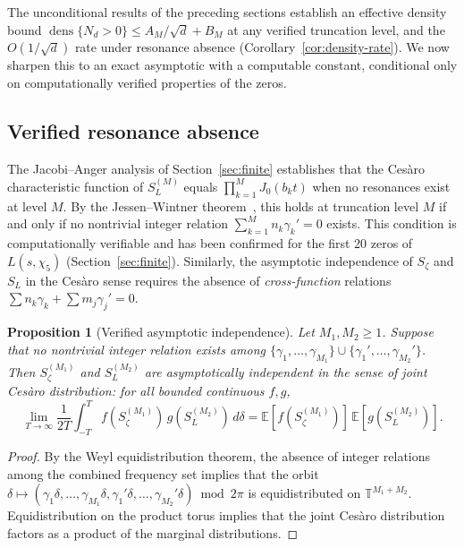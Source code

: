 \documentclass[12pt,reqno]{amsart}
\theoremstyle{plain}
\newtheorem{proposition}[theorem]{Proposition}
\theoremstyle{definition}
\theoremstyle{remark}
\DeclareMathOperator{\dens}{dens}
\newcommand{\T}{\mathbb{T}}
\newcommand{\E}{\mathbb{E}}
\begin{document}
The unconditional results of the preceding sections establish an effective density bound $\dens\{N_d > 0\} \leq A_M/\sqrt{d} + B_M$ at any verified truncation level, and the $O(1/\sqrt{d})$ rate under resonance absence (Corollary~\ref{cor:density-rate}).  We now sharpen this to an exact asymptotic with a computable constant, conditional only on computationally verified properties of the zeros.


\subsection{Verified resonance absence}

The Jacobi--Anger analysis of Section~\ref{sec:finite} establishes that the Ces\`aro characteristic function of $S_L^{(M)}$ equals $\prod_{k=1}^M J_0(b_k t)$ when no resonances exist at level $M$.  By the Jessen--Wintner theorem~\cite{JessenWintner}, this holds at truncation level $M$ if and only if no nontrivial integer relation $\sum_{k=1}^M n_k\gamma_k' = 0$ exists.  This condition is computationally verifiable and has been confirmed for the first 20 zeros of $L(s,\chi_5)$ (Section~\ref{sec:finite}).  Similarly, the asymptotic independence of $S_\zeta$ and $S_L$ in the Ces\`aro sense requires the absence of \emph{cross-function} relations $\sum n_k\gamma_k + \sum m_j\gamma_j' = 0$.

\begin{proposition}[Verified asymptotic independence]\label{prop:verified_indep}
Let $M_1, M_2 \geq 1$.  Suppose that no nontrivial integer relation exists among $\{\gamma_1,\ldots,\gamma_{M_1}\} \cup \{\gamma_1',\ldots,\gamma_{M_2}'\}$.  Then $S_\zeta^{(M_1)}$ and $S_L^{(M_2)}$ are asymptotically independent in the sense of joint Ces\`aro distribution: for all bounded continuous $f, g$,
\[
  \lim_{T\to\infty}\frac{1}{2T}\int_{-T}^T f(S_\zeta^{(M_1)})\, g(S_L^{(M_2)})\, d\delta = \E[f(S_\zeta^{(M_1)})]\, \E[g(S_L^{(M_2)})].
\]
\end{proposition}

\begin{proof}
By the Weyl equidistribution theorem, the absence of integer relations among the combined frequency set implies that the orbit $\delta \mapsto (\gamma_1\delta,\ldots,\gamma_{M_1}\delta,\gamma_1'\delta,\ldots,\gamma_{M_2}'\delta) \bmod 2\pi$ is equidistributed on $\T^{M_1+M_2}$.  Equidistribution on the product torus implies that the joint Ces\`aro distribution factors as a product of the marginal distributions.
\end{proof}
\end{document}
